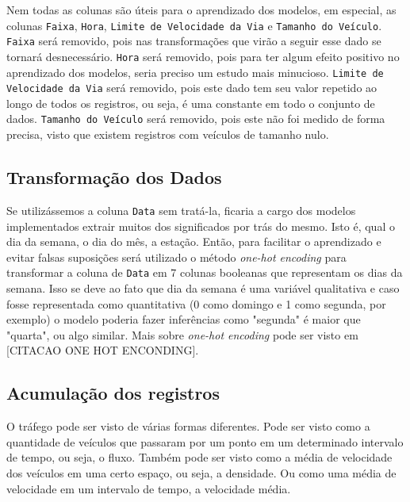 Nem todas as colunas são úteis para o aprendizado dos modelos, em especial, as colunas \texttt{Faixa}, \texttt{Hora}, \texttt{Limite de Velocidade da Via} e \texttt{Tamanho do Veículo}. \texttt{Faixa} será removido, pois nas transformações que virão a seguir esse dado se tornará desnecessário. \texttt{Hora} será removido, pois para ter algum efeito positivo no aprendizado dos modelos, seria preciso um estudo mais minucioso. \texttt{Limite de Velocidade da Via} será removido, pois este dado tem seu valor repetido ao longo de todos os registros, ou seja, é uma constante em todo o conjunto de dados. \texttt{Tamanho do Veículo} será removido, pois este não foi medido de forma precisa, visto que existem registros com veículos de tamanho nulo.


\subsection{Transformação dos Dados}



Se utilizássemos a coluna \texttt{Data} sem tratá-la, ficaria a cargo dos modelos implementados extrair muitos dos significados por trás do mesmo. Isto é, qual o dia da semana, o dia do mês, a estação. Então, para facilitar o aprendizado e evitar falsas suposições será utilizado o método \textit{one-hot encoding} para transformar a coluna de \texttt{Data} em 7 colunas booleanas que representam os dias da semana. Isso se deve ao fato que dia da semana é uma variável qualitativa e caso fosse representada como quantitativa (0 como domingo e 1 como segunda, por exemplo) o modelo poderia fazer inferências como "segunda" é maior que "quarta", ou algo similar. Mais sobre \textit{one-hot encoding} pode ser visto em [CITACAO ONE HOT ENCONDING].

\subsection{Acumulação dos registros}

O tráfego pode ser visto de várias formas diferentes. Pode ser visto como a quantidade de veículos que passaram por um ponto em um determinado intervalo de tempo, ou seja, o fluxo. Também pode ser visto como a média de velocidade dos veículos em uma certo espaço, ou seja, a densidade. Ou como uma média de velocidade em um intervalo de tempo, a velocidade média.

